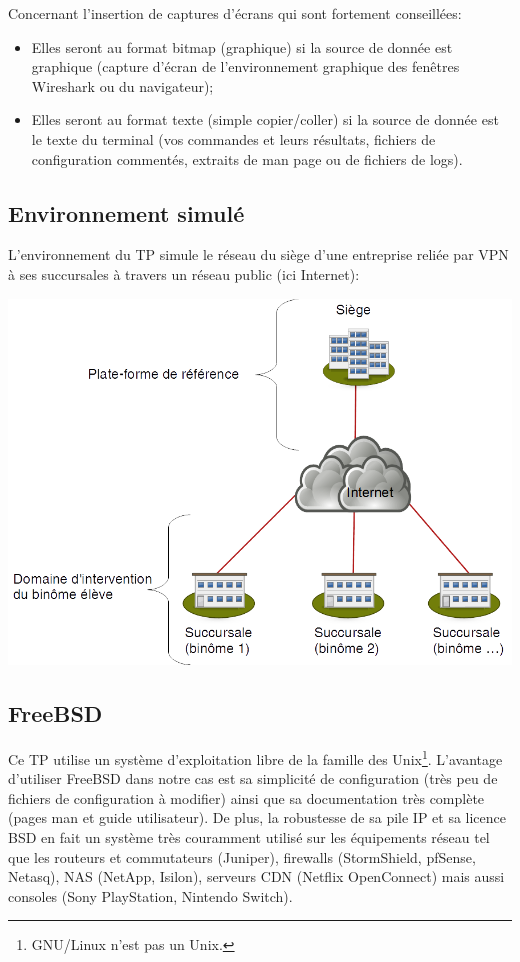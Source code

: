 \documentclass[a4paper,11pt]{article}
\begin{document}
Concernant l'insertion de captures d'écrans qui sont fortement conseillées:
\begin{itemize}
\item Elles seront au format bitmap (graphique) si la source de donnée est graphique (capture d'écran de l'environnement graphique des fenêtres Wireshark ou du navigateur);
\item Elles seront au format texte (simple copier/coller) si la source de donnée est le texte du terminal (vos commandes et leurs résultats, fichiers de configuration commentés, extraits de man page ou de fichiers de logs).
\end{itemize}

\clearpage
\subsection{Environnement simulé}
L'environnement du TP simule le réseau du siège d'une entreprise reliée par VPN à ses succursales à travers un réseau public (ici Internet):
\begin{center}
\includegraphics[width=0.6\linewidth]{environnement-simule}
\end{center}
\subsection{FreeBSD}
Ce TP utilise un système d'exploitation libre de la famille des Unix\footnote{GNU/Linux n'est pas un Unix.}. L'avantage d'utiliser FreeBSD dans notre cas est sa simplicité de configuration (très peu de fichiers de configuration à modifier) ainsi que sa documentation très complète (pages man et guide utilisateur). De plus, la robustesse de sa pile IP et sa licence BSD en fait un système très couramment utilisé sur les équipements réseau tel que les routeurs et commutateurs (Juniper), firewalls (StormShield, pfSense, Netasq), NAS (NetApp, Isilon), serveurs CDN (Netflix OpenConnect) mais aussi consoles (Sony PlayStation, Nintendo Switch).
\end{document}
